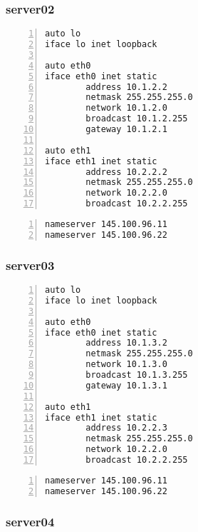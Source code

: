\documentclass[Configuration]{subfiles}
\begin{document}
\subsubsection{server02}

\begin{lstlisting}[frame=single,caption=/etc/network/interfaces,backgroundcolor=\color{gray},breaklines=true,numbers=left,]
auto lo
iface lo inet loopback

auto eth0
iface eth0 inet static
        address 10.1.2.2
        netmask 255.255.255.0
        network 10.1.2.0
        broadcast 10.1.2.255
        gateway 10.1.2.1

auto eth1
iface eth1 inet static
        address 10.2.2.2
        netmask 255.255.255.0
        network 10.2.2.0
        broadcast 10.2.2.255
\end{lstlisting}

\begin{lstlisting}[frame=single,caption=/etc/resolv.conf,backgroundcolor=\color{gray},breaklines=true,numbers=left,]
nameserver 145.100.96.11
nameserver 145.100.96.22
\end{lstlisting}

\subsubsection{server03}

\begin{lstlisting}[frame=single,caption=/etc/network/interfaces,backgroundcolor=\color{gray},breaklines=true,numbers=left,]
auto lo
iface lo inet loopback

auto eth0
iface eth0 inet static
        address 10.1.3.2
        netmask 255.255.255.0
        network 10.1.3.0
        broadcast 10.1.3.255
        gateway 10.1.3.1

auto eth1
iface eth1 inet static
        address 10.2.2.3
        netmask 255.255.255.0
        network 10.2.2.0
        broadcast 10.2.2.255
\end{lstlisting}

\begin{lstlisting}[frame=single,caption=/etc/resolv.conf,backgroundcolor=\color{gray},breaklines=true,numbers=left,]
nameserver 145.100.96.11
nameserver 145.100.96.22
\end{lstlisting}

\subsubsection{server04}
\end{document}
